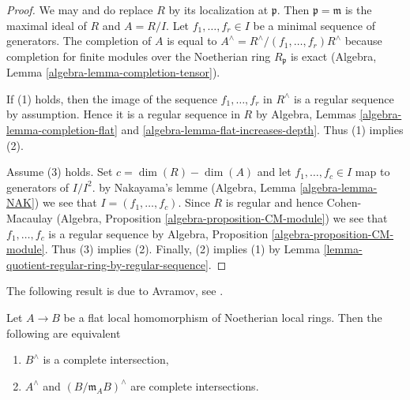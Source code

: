 \begin{proof}
We may and do replace $R$ by its localization at $\mathfrak p$.
Then $\mathfrak p = \mathfrak m$ is the maximal ideal of $R$
and $A = R/I$. Let $f_1, \ldots, f_r \in I$ be a minimal sequence
of generators.  The completion of $A$ is equal to
$A^\wedge = R^\wedge/(f_1, \ldots, f_r)R^\wedge$
because completion for finite modules over the Noetherian ring
$R_\mathfrak p$ is exact
(Algebra, Lemma \ref{algebra-lemma-completion-tensor}).

\medskip\noindent
If (1) holds, then the image of the sequence $f_1, \ldots, f_r$ in $R^\wedge$
is a regular sequence by assumption. Hence it is a regular sequence
in $R$ by Algebra, Lemmas \ref{algebra-lemma-completion-flat} and
\ref{algebra-lemma-flat-increases-depth}. Thus (1) implies (2).

\medskip\noindent
Assume (3) holds. Set $c = \dim(R) - \dim(A)$ and let $f_1, \ldots, f_c \in I$
map to generators of $I/I^2$. by Nakayama's lemme
(Algebra, Lemma \ref{algebra-lemma-NAK})
we see that $I = (f_1, \ldots, f_c)$. Since $R$ is regular and hence
Cohen-Macaulay (Algebra, Proposition \ref{algebra-proposition-CM-module})
we see that $f_1, \ldots, f_c$ is a regular sequence by
Algebra, Proposition \ref{algebra-proposition-CM-module}.
Thus (3) implies (2).
Finally, (2) implies (1) by
Lemma \ref{lemma-quotient-regular-ring-by-regular-sequence}.
\end{proof}

\noindent
The following result is due to Avramov, see \cite{Avramov}.

\begin{proposition}
\label{proposition-avramov}
Let $A \to B$ be a flat local homomorphism of Noetherian local rings.
Then the following are equivalent
\begin{enumerate}
\item $B^\wedge$ is a complete intersection,
\item $A^\wedge$ and $(B/\mathfrak m_A B)^\wedge$ are complete intersections.
\end{enumerate}
\end{proposition}

